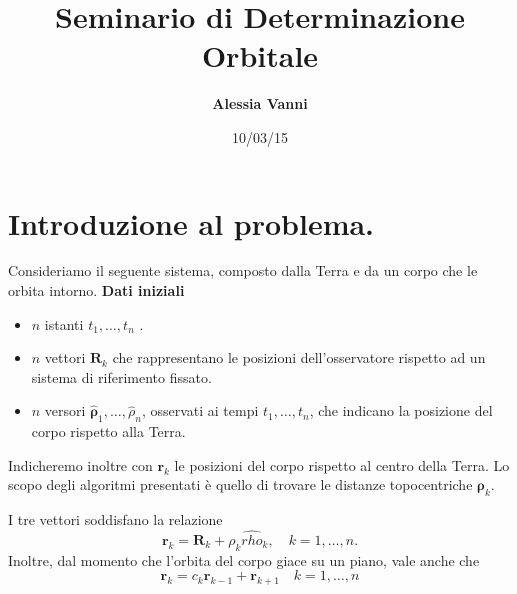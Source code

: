 \documentclass{beamer}
\begin{document}
\title[]{\bf Seminario di Determinazione Orbitale}

\author[Alessia Vanni]{\textcolor{MyDarkBlue}{\bf \large Alessia Vanni} }
    

\date{10/03/15}

\small
\begin{frame}[plain]
\titlepage
\end{frame}
\begin{frame}[plain]
\tableofcontents
\end{frame}
\section{Introduzione al problema.}
\begin{frame}
Consideriamo il seguente sistema, composto dalla Terra e da un corpo che le orbita intorno. 
\vskip 0.5cm
\textbf{Dati iniziali}
\begin{itemize}
\item $n$ istanti $t_1, \dots, t_n$ .
\item $n$ vettori $\textbf{R}_k$ che rappresentano le posizioni dell'osservatore rispetto ad un sistema di riferimento fissato.
\item $n$ versori $ \hat{\mathbf{\rho}}_1, \dots, \hat{ \rho }_n$, osservati ai tempi $t_1, \dots, t_n$, che indicano la posizione del corpo rispetto alla Terra.
\end{itemize}


\vskip 0.5cm



\end{frame}
\begin{frame}[plain]
Indicheremo inoltre con $\textbf{r}_k$ le posizioni del corpo rispetto al centro della Terra.
Lo scopo degli algoritmi presentati \`e quello di trovare le distanze topocentriche $\mathbf \rho_k$. 

I tre vettori soddisfano la relazione
 \begin{equation}
\textbf{r}_k=\textbf{R}_k+ \rho_k \hat{rho}_k, \quad k=1,\dots, n.
\end{equation}
Inoltre, dal momento che l'orbita del corpo giace su un piano, vale anche che \begin{equation}
\textbf{r}_k=c_k \textbf{r}_{k-1} + \textbf{r}_{k+1} \quad k=1,\dots, n
\end{equation}

\end{frame}
\end{document}
